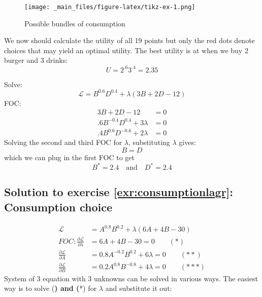 \documentclass[
  12pt,
  oneside]{book}
\theoremstyle{definition}
\theoremstyle{definition}
\theoremstyle{definition}
\theoremstyle{definition}
\theoremstyle{remark}
\begin{document}
\begin{figure}
\centering
\texttt{[image: \_main\_files/figure-latex/tikz-ex-1.png]}
\caption{\label{fig:tikz-ex}Possible bundles of consumption}
\end{figure}

We now should calculate the utility of all 19 points but only the red dots denote choices that may yield an optimal utility. The best utility is at when we buy 2 burger and 3 drinks: \[U=2^{.6}3^{.4}=2.35\]

Solve:
\[
        \mathcal{L}=B^{0.6}D^{0.4}+\lambda(3B+2D-12)
        \]
FOC:
\begin{align*}
            3B+2D-12&=0\\
            .6B^{-0.4}D^{0.4}+3\lambda&=0\\
            .4B^{0.6}D^{-0.6}+2\lambda&=0
        \end{align*}
Solving the second and third FOC for \(\lambda\), substituting \(\lambda\) gives:
\[B=D\]
which we can plug in the first FOC to get
\[B^*=2.4 \quad \text{and} \quad D^*=2.4\]

\hypertarget{sol:consumptionlagr}{%
\subsection*{Solution to exercise \ref{exr:consumptionlagr}: Consumption choice}\label{sol:consumptionlagr}}

\begin{align*}
        \mathcal{L}&=A^{0.8}B^{0.2}+\lambda(6A+4B-30)\\
        FOC: \frac{\partial \mathcal{L}}{\partial \lambda}&=6A+4B-30=0 \qquad (*)\\
        \frac{\partial \mathcal{L}}{\partial A}&=0.8A^{-0.2}B^{0.2}+6\lambda=0 \qquad (**)\\
        \frac{\partial \mathcal{L}}{\partial B}&=0.2A^{0.8}B^{-0.8}+4\lambda=0 \qquad (***)
    \end{align*}
System of 3 equation with 3 unknowns can be solved in various ways. The easiest way is to solve (\textbf{) and (}*) for \(\lambda\) and substitute it out:
\end{document}
